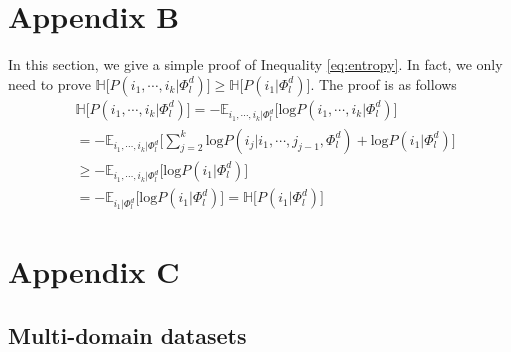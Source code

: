 \documentclass[11pt]{article}
\begin{document}
\section{Appendix B}
\label{appendix:b}
In this section, we give a simple proof of Inequality \ref{eq:entropy}. In fact, we only need to prove $\mathbb{H} \big[ P(i_1,\cdots,i_k | \Phi_l^d) \big] \geqslant \mathbb{H} \big[ P(i_1 | \Phi_l^d) \big]$. The proof is as follows
\begin{align*}
&\mathbb{H} \big[ P(i_1,\cdots,i_k | \Phi_l^d) \big] = - \mathbb{E}_{i_1,\cdots,i_k | \Phi_l^d} \big[ \text{log}P(i_1,\cdots,i_k | \Phi_l^d) \big] \\
&= -\mathbb{E}_{i_1,\cdots,i_k | \Phi_l^d} \big[ \displaystyle{\sum_{j=2}^k}\text{log}P(i_j | i_1,\cdots,j_{j-1},\Phi_l^d) +  \text{log} P(i_1 | \Phi_l^d) \big] \\
&\geqslant -\mathbb{E}_{i_1,\cdots,i_k | \Phi_l^d} \big[ \text{log} P(i_1 | \Phi_l^d) \big] \\
&= -\mathbb{E}_{i_1 | \Phi_l^d} \big[ \text{log} P(i_1 | \Phi_l^d) \big] = \mathbb{H} \big[ P(i_1 | \Phi_l^d) \big]
\end{align*}
\section{Appendix C}
\label{appendix:c}
\subsection{Multi-domain datasets}
\end{document}
